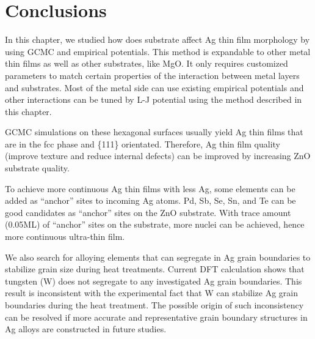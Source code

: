 \section{Conclusions}
In this chapter, we studied how does substrate affect Ag thin film morphology by using \ac{GCMC} and empirical potentials. This method is expandable to other metal thin films as well as other substrates, like MgO. It only requires customized parameters to match certain properties of the interaction between metal layers and substrates. Most of the metal side can use existing empirical potentials and other interactions can be tuned by \ac{L-J} potential using the method described in this chapter.

\ac{GCMC} simulations on these hexagonal surfaces usually yield Ag thin films that are in the fcc phase and \{111\} orientated. Therefore, Ag thin film quality (improve texture and reduce internal defects) can be improved by increasing ZnO substrate quality.

To achieve more continuous Ag thin films with less Ag, some elements can be added as ``anchor'' sites to incoming Ag atoms. Pd, Sb, Se, Sn, and Te can be good candidates as ``anchor'' sites on the ZnO substrate. With trace amount (0.05\ac{ML}) of ``anchor'' sites on the substrate, more nuclei can be achieved, hence more continuous ultra-thin film.

We also search for alloying elements that can segregate in Ag grain boundaries to stabilize grain size during heat treatments. Current \ac{DFT} calculation shows that tungsten (W) does not segregate to any investigated Ag grain boundaries. This result is inconsistent with the experimental fact that W can stabilize Ag grain boundaries during the heat treatment. The possible origin of such inconsistency can be resolved if more accurate and representative grain boundary structures in Ag alloys are constructed in future studies.